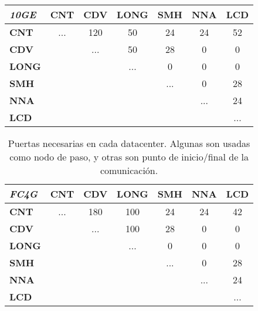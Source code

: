 \begin{table}[!hbt]
\begin{center}
\begin{tabular}{||l | c  c  c  c  c  c||}
\hline
\hline
 \textbf{\textit{10GE}}& \textbf{CNT} & \textbf{CDV} & \textbf{LONG} & \textbf{SMH} & \textbf{NNA} & \textbf{LCD}  \\
\hline
\textbf{CNT} & ... & 120 & 50 & 24 & 24 & 52\\
\hline
\textbf{CDV} &  & ... & 50 & 28 & 0 & 0\\
\hline
\textbf{LONG} &  &  & ... & 0 & 0 & 0\\
\hline
\textbf{SMH} &  &  &  & ... & 0 & 28\\
\hline
\textbf{NNA} & & & & & ... & 24\\
\hline
\textbf{LCD} & & & & & & ... \\
\hline
\end{tabular}
\end{center}
\end{table}

\begin{table}[!hbt]
\begin{center}
\begin{tabular}{||l | c  c  c  c  c  c||}
\hline
\hline
 \textbf{\textit{FC4G}}& \textbf{CNT} & \textbf{CDV} & \textbf{LONG} & \textbf{SMH} & \textbf{NNA} & \textbf{LCD}  \\
\hline
\textbf{CNT} & ... & 180 & 100 & 24 & 24 & 42\\
\hline
\textbf{CDV} &  & ... & 100 & 28 & 0 & 0\\
\hline
\textbf{LONG} &  &  & ... & 0 & 0 & 0\\
\hline
\textbf{SMH} &  &  &  & ... & 0 & 28\\
\hline
\textbf{NNA} & & & & & ... & 24\\
\hline
\textbf{LCD} & & & & & & ... \\
\hline
\end{tabular}
\caption[Puertas de cada DataCenter]{Puertas necesarias en cada datacenter. Algunas son usadas como nodo de paso, y otras son punto de inicio/final de la comunicación.}
  \label{fig:puertas}
\end{center}
\end{table}



